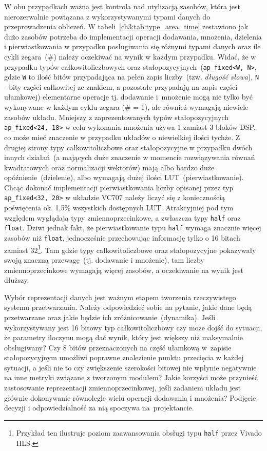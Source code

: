 W obu przypadkach ważna jest kontrola nad utylizacją zasobów, która jest nierozerwalnie powiązana z wykorzystywanymi typami danych do przeprowadzenia obliczeń. W tabeli~\ref{ch3:tab:type_area_time} zestawiono jak dużo zasobów potrzeba do implementacji operacji dodawania, mnożenia, dzielenia i pierwiastkowania w przypadku posługiwania się różnymi typami danych oraz ile cykli zegara~(\#) należy oczekiwać na wynik w każdym przypadku. Widać, że w przypadku typów całkowitoliczbowych oraz stałopozycyjnych~(\texttt{ap\_fixed<W, N>}, gdzie \texttt{W} to ilość bitów przypadająca na pełen zapis liczby~(tzw. \textit{długość słowa}), \texttt{N} - bity części całkowitej ze znakiem, a pozostałe przypadają na zapis części ułamkowej) elementarne operacje tj. dodawanie i~mnożenie mogą nie tylko być wykonywane w każdym cyklu zegara (\# = 1), ale również wymagają niewiele zasobów układu. Mniejszy z zaprezentowanych typów stałopozycyjnych \texttt{ap\_fixed\textless{}24, 18\textgreater{}} w celu wykonania mnożenia używa 1 zamiast 3 bloków DSP, co może mieć znaczenie w przypadku układów o niewielkiej ilości tychże. Z drugiej strony typy całkowitoliczbowe oraz stałopozycyjne w przypadku dwóch innych działań~(a mających duże znaczenie w momencie rozwiązywania równań kwadratowych oraz normalizacji wektorów) mają albo bardzo duże opóźnienie~(dzielenie), albo wymagają dużej ilości LUT~(pierwiastkowanie). Chcąc dokonać implementacji pierwiastkowania liczby opisanej przez typ \texttt{ap\_fixed\textless{}32, 20\textgreater{}} w układzie VC707 należy liczyć się z koniecznością poświęcenia ok. 1,5\% wszystkich dostępnych LUT. Atrakcyjniej pod tym względem wyglądają typy zmiennoprzecinkowe, a zwłaszcza typy \texttt{half} oraz \texttt{float}. Dziwi jednak fakt, że pierwiastkowanie typu \texttt{half} wymaga znacznie więcej zasobów niż \texttt{float}, jednocześnie przechowując informację tylko o 16 bitach zamiast 32\footnote{Przykład ten ilustruje poziom zaawansowania obsługi typu \texttt{half} przez Vivado HLS.}. Tam gdzie typy całkowitoliczbowe oraz stałopozycyjne pokazywały swoją znaczną przewagę~(tj. dodawanie i mnożenie), tam liczby zmiennoprzecinkowe wymagają więcej zasobów, a oczekiwanie na wynik jest dłuższy.  

Wybór reprezentacji danych jest ważnym etapem tworzenia rzeczywistego systemu przetwarzania. Należy odpowiedzieć sobie na pytanie, jakie dane będą przetwarzane oraz jakie będzie ich zróżnicowanie~(dynamika). Jeśli wykorzystywany jest 16 bitowy typ całkowitoliczbowy czy może dojść do sytuacji, że parametry iloczynu mogą dać wynik, który jest większy niż maksymalnie obsługiwany? Czy 8 bitów przeznaczonych na część ułamkową w~zapisie stałopozycyjnym umożliwi poprawne znalezienie punktu przecięcia w każdej sytuacji, a jeśli nie to czy zwiększenie szerokości bitowej nie wpłynie negatywnie na inne metryki związane z tworzonym modułem? Jakie korzyści może przynieść zastosowanie reprezentacji zmiennoprzecinkowej, jeśli zadaniem układu jest głównie dokonywanie równolegle wielu operacji dodawania i mnożenia?  Podjęcie decyzji i odpowiedzialność za nią spoczywa na~projektancie.

